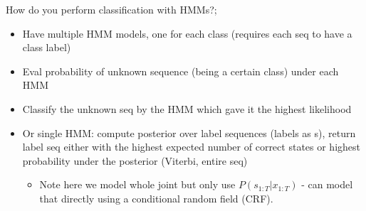 \documentclass{article}
\begin{document}
How do you perform classification with HMMs?; \begin{itemize} \item Have multiple HMM models, one for each class (requires each seq to have a class label) \item Eval probability of unknown sequence (being a certain class) under each HMM \item Classify the unknown seq by the HMM which gave it the highest likelihood \item Or single HMM: compute posterior over label sequences (labels as s), return label seq either with the highest expected number of correct states or highest probability under the posterior (Viterbi, entire seq) \begin{itemize} \item Note here we model whole joint but only use $P(s_{1:T}|x_{1:T})$ - can model that directly using a conditional random field (CRF). \end{itemize} \end{itemize}

\end{document}
